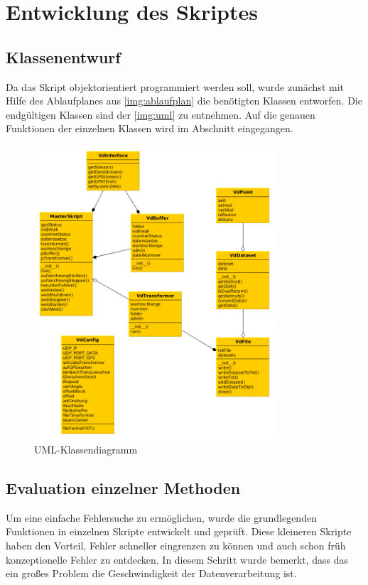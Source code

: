 \documentclass[a4paper,12pt,bibliography=totoc, listof=totoc,titlepage,pointlessnumbers]{scrreprt}
\begin{document}
\chapter{Entwicklung des Skriptes}
\label{c:skript}

\section{Klassenentwurf}
Da das Skript objektorientiert programmiert werden soll, wurde zunächst mit Hilfe des Ablaufplanes aus \autoref{img:ablaufplan} die benötigten Klassen entworfen. Die endgültigen Klassen sind der \autoref{img:uml} zu entnehmen. Auf die genauen Funktionen der einzelnen Klassen wird im Abschnitt  eingegangen.

\begin{figure}
 \centering
 \includegraphics[width=0.8\textwidth]{./img/UML.png}
 \caption{UML-Klassendiagramm}
 \label{img:uml}
\end{figure}

\section{Evaluation einzelner Methoden}
Um eine einfache Fehlersuche zu ermöglichen, wurde die grundlegenden Funktionen in einzelnen Skripte entwickelt und geprüft. Diese kleineren Skripte haben den Vorteil, Fehler schneller eingrenzen zu können und auch schon früh konzeptionelle Fehler zu entdecken. In diesem Schritt wurde bemerkt, dass das ein großes Problem die Geschwindigkeit der Datenverarbeitung ist. 
\end{document}
